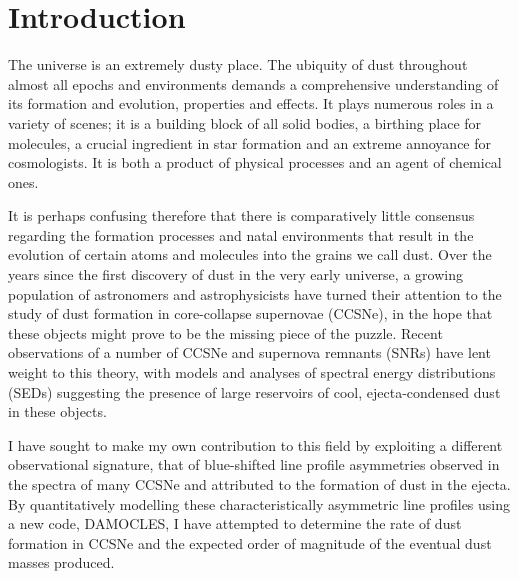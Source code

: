 \chapter{Introduction}\label{chp:chp1}

%
%



The universe is an extremely dusty place.  The ubiquity of dust throughout almost all epochs and environments demands a comprehensive understanding of its formation and evolution, properties and effects.  It plays numerous roles in a variety of scenes; it is a building block of  all solid bodies, a birthing place for molecules, a crucial ingredient in star formation and an extreme annoyance for cosmologists.  It is both a product of physical processes and an agent of chemical ones.

It is perhaps confusing therefore that there is comparatively little consensus regarding the formation processes and natal environments that result in the evolution of certain atoms and molecules into the grains we call dust.  Over the years since the first discovery  of dust in the very early universe, a growing population of astronomers and astrophysicists have turned their attention to the study of dust formation in core-collapse supernovae (CCSNe), in the hope that these objects might prove to be the missing piece of the puzzle.  Recent observations of a number of CCSNe and supernova remnants (SNRs) have lent weight to this theory, with models and analyses of spectral energy distributions (SEDs)  suggesting the presence of large reservoirs of cool, ejecta-condensed dust in these objects. 

I have sought to make my own contribution to this field by exploiting a different observational signature, that of  blue-shifted line profile asymmetries observed in the spectra of many CCSNe and attributed to the formation of dust in the ejecta.  By quantitatively modelling these characteristically asymmetric line profiles using a new code, DAMOCLES, I have attempted to determine the rate of dust formation in CCSNe and the expected order of magnitude of the eventual dust masses produced.

